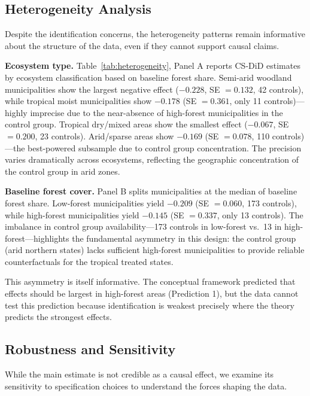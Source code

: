 \documentclass[12pt]{article}
\begin{document}
\subsection{Heterogeneity Analysis}

Despite the identification concerns, the heterogeneity patterns remain informative about the structure of the data, even if they cannot support causal claims.



\textbf{Ecosystem type.} Table~\ref{tab:heterogeneity}, Panel A reports CS-DiD estimates by ecosystem classification based on baseline forest share. Semi-arid woodland municipalities show the largest negative effect ($-0.228$, SE $= 0.132$, 42 controls), while tropical moist municipalities show $-0.178$ (SE $= 0.361$, only 11 controls)---highly imprecise due to the near-absence of high-forest municipalities in the control group. Tropical dry/mixed areas show the smallest effect ($-0.067$, SE $= 0.200$, 23 controls). Arid/sparse areas show $-0.169$ (SE $= 0.078$, 110 controls)---the best-powered subsample due to control group concentration. The precision varies dramatically across ecosystems, reflecting the geographic concentration of the control group in arid zones.

\textbf{Baseline forest cover.} Panel B splits municipalities at the median of baseline forest share. Low-forest municipalities yield $-0.209$ (SE $= 0.060$, 173 controls), while high-forest municipalities yield $-0.145$ (SE $= 0.337$, only 13 controls). The imbalance in control group availability---173 controls in low-forest vs.\ 13 in high-forest---highlights the fundamental asymmetry in this design: the control group (arid northern states) lacks sufficient high-forest municipalities to provide reliable counterfactuals for the tropical treated states.

This asymmetry is itself informative. The conceptual framework predicted that effects should be largest in high-forest areas (Prediction 1), but the data cannot test this prediction because identification is weakest precisely where the theory predicts the strongest effects.

\subsection{Robustness and Sensitivity}

While the main estimate is not credible as a causal effect, we examine its sensitivity to specification choices to understand the forces shaping the data.
\end{document}

